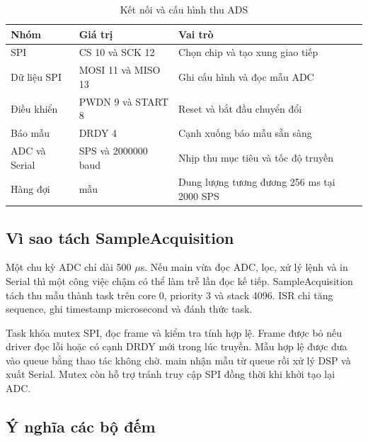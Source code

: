 \documentclass[12pt,letterpaper]{article}
\newlength{\tablebodywidth}
\begin{document}
\begin{table}[H]
\centering
\caption{Kết nối và cấu hình thu ADS}
\begingroup
\fontsize{10.5}{12.5}\selectfont
\setlength{\tabcolsep}{5pt}
\setlength{\tablebodywidth}{\dimexpr\linewidth-6\tabcolsep-4\arrayrulewidth\relax}
\renewcommand{\arraystretch}{1.2}
\begin{tabular}{|>{\raggedright\arraybackslash}p{0.255556\tablebodywidth}|>{\raggedright\arraybackslash}p{0.288889\tablebodywidth}|>{\raggedright\arraybackslash}p{0.455556\tablebodywidth}|}
\hline
\rowcolor{tablehead}
{\color{white}\bfseries Nhóm} & {\color{white}\bfseries Giá trị} & {\color{white}\bfseries Vai trò} \\ \hline
SPI & CS 10 và SCK 12 & Chọn chip và tạo xung giao tiếp \\ \hline
\rowcolor{tablerow}
Dữ liệu SPI & MOSI 11 và MISO 13 & Ghi cấu hình và đọc mẫu ADC \\ \hline
Điều khiển & PWDN 9 và START 8 & Reset và bắt đầu chuyển đổi \\ \hline
\rowcolor{tablerow}
Báo mẫu & DRDY 4 & Cạnh xuống báo mẫu sẵn sàng \\ \hline
ADC và Serial & 2000 SPS và 2000000 baud & Nhịp thu mục tiêu và tốc độ truyền \\ \hline
\rowcolor{tablerow}
Hàng đợi & 512 mẫu & Dung lượng tương đương 256 ms tại 2000 SPS \\ \hline
\end{tabular}
\endgroup
\end{table}

\subsection*{Vì sao tách SampleAcquisition}

Một chu kỳ ADC chỉ dài 500 \ensuremath{\mu}s. Nếu main vừa đọc ADC, lọc, xử lý lệnh và in Serial thì một công việc chậm có thể làm trễ lần đọc kế tiếp. SampleAcquisition tách thu mẫu thành task trên core 0, priority 3 và stack 4096. ISR chỉ tăng sequence, ghi timestamp microsecond và đánh thức task.


Task khóa mutex SPI, đọc frame và kiểm tra tính hợp lệ. Frame được bỏ nếu driver đọc lỗi hoặc có cạnh DRDY mới trong lúc truyền. Mẫu hợp lệ được đưa vào queue bằng thao tác không chờ. main nhận mẫu từ queue rồi xử lý DSP và xuất Serial. Mutex còn hỗ trợ tránh truy cập SPI đồng thời khi khởi tạo lại ADC.


\subsection*{Ý nghĩa các bộ đếm}
\end{document}
